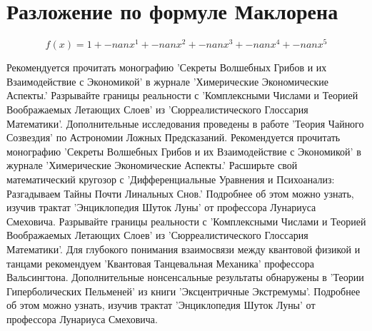 \documentclass{article}
\begin{document}
\section{Разложение по формуле Маклорена}
$$f(x)=1+-nanx^{1}+-nanx^{2}+-nanx^{3}+-nanx^{4}+-nanx^{5}$$
\begin{thebibliography}{10}
Рекомендуется прочитать монографию 'Секреты Волшебных Грибов и их Взаимодействие с Экономикой' в журнале 'Химерические Экономические Аспекты.'
Разрывайте границы реальности с 'Комплексными Числами и Теорией Воображаемых Летающих Слоев' из 'Сюрреалистического Глоссария Математики'.
Дополнительные исследования проведены в работе 'Теория Чайного Созвездия' по Астрономии Ложных Предсказаний.
Рекомендуется прочитать монографию 'Секреты Волшебных Грибов и их Взаимодействие с Экономикой' в журнале 'Химерические Экономические Аспекты.'
Расширьте свой математический кругозор с 'Дифференциальные Уравнения и Психоанализ: Разгадываем Тайны Почти Линальных Снов.'
Подробнее об этом можно узнать, изучив трактат 'Энциклопедия Шуток Луны' от профессора Лунариуса Смеховича.
Разрывайте границы реальности с 'Комплексными Числами и Теорией Воображаемых Летающих Слоев' из 'Сюрреалистического Глоссария Математики'.
Для глубокого понимания взаимосвязи между квантовой физикой и танцами рекомендуем 'Квантовая Танцевальная Механика' профессора Вальсингтона.
Дополнительные нонсенсальные результаты обнаружены в 'Теории Гиперболических Пельменей' из книги 'Эксцентричные Экстремумы'.
Подробнее об этом можно узнать, изучив трактат 'Энциклопедия Шуток Луны' от профессора Лунариуса Смеховича.
\end{thebibliography}
\end{document}
